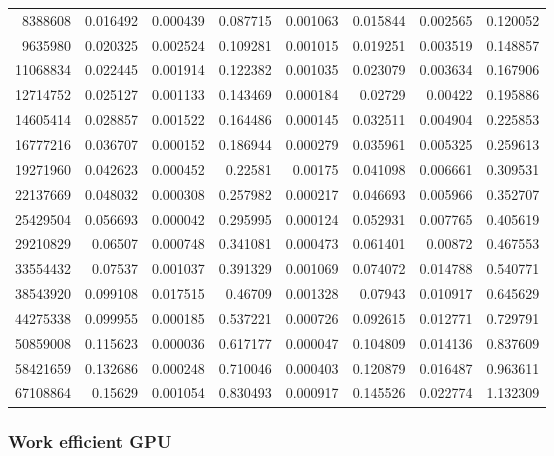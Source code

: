 \begin{longtable}{r r r r r r r r}
8388608 & 0.016492 & 0.000439 & 0.087715 & 0.001063 & 0.015844 & 0.002565 & 0.120052 \\
9635980 & 0.020325 & 0.002524 & 0.109281 & 0.001015 & 0.019251 & 0.003519 & 0.148857 \\
11068834 & 0.022445 & 0.001914 & 0.122382 & 0.001035 & 0.023079 & 0.003634 & 0.167906 \\
12714752 & 0.025127 & 0.001133 & 0.143469 & 0.000184 & 0.02729 & 0.00422 & 0.195886 \\
14605414 & 0.028857 & 0.001522 & 0.164486 & 0.000145 & 0.032511 & 0.004904 & 0.225853 \\
16777216 & 0.036707 & 0.000152 & 0.186944 & 0.000279 & 0.035961 & 0.005325 & 0.259613 \\
19271960 & 0.042623 & 0.000452 & 0.22581 & 0.00175 & 0.041098 & 0.006661 & 0.309531 \\
22137669 & 0.048032 & 0.000308 & 0.257982 & 0.000217 & 0.046693 & 0.005966 & 0.352707 \\
25429504 & 0.056693 & 0.000042 & 0.295995 & 0.000124 & 0.052931 & 0.007765 & 0.405619 \\
29210829 & 0.06507 & 0.000748 & 0.341081 & 0.000473 & 0.061401 & 0.00872 & 0.467553 \\
33554432 & 0.07537 & 0.001037 & 0.391329 & 0.001069 & 0.074072 & 0.014788 & 0.540771 \\
38543920 & 0.099108 & 0.017515 & 0.46709 & 0.001328 & 0.07943 & 0.010917 & 0.645629 \\
44275338 & 0.099955 & 0.000185 & 0.537221 & 0.000726 & 0.092615 & 0.012771 & 0.729791 \\
50859008 & 0.115623 & 0.000036 & 0.617177 & 0.000047 & 0.104809 & 0.014136 & 0.837609 \\
58421659 & 0.132686 & 0.000248 & 0.710046 & 0.000403 & 0.120879 & 0.016487 & 0.963611 \\
67108864 & 0.15629 & 0.001054 & 0.830493 & 0.000917 & 0.145526 & 0.022774 & 1.132309 \\
\end{longtable}

\subsubsection{Work efficient GPU}

